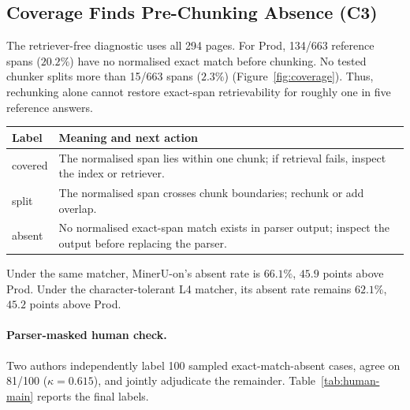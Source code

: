 \documentclass[11pt]{article}
\newcommand{\contribCoverage}{C3}
\begin{document}
\subsection{Coverage Finds Pre-Chunking Absence (\contribCoverage)}
\label{sec:c3}

The retriever-free diagnostic uses all 294 pages. For Prod, 134/663 reference spans ($20.2\%$) have no normalised exact match before chunking. No tested chunker splits more than 15/663 spans ($2.3\%$) (Figure~\ref{fig:coverage}). Thus, rechunking alone cannot restore exact-span retrievability for roughly one in five reference answers.

\begin{center}
\begin{minipage}{\columnwidth}
\centering\footnotesize
\setlength{\tabcolsep}{4pt}
\begin{tabular}{p{}p{}}
\toprule
Label & Meaning and next action \\
\midrule
covered & The normalised span lies within one chunk; if retrieval fails, inspect the index or retriever. \\
split & The normalised span crosses chunk boundaries; rechunk or add overlap. \\
absent & No normalised exact-span match exists in parser output; inspect the output before replacing the parser. \\
\bottomrule
\end{tabular}
\label{tab:coverage-actions}
\end{minipage}
\end{center}

Under the same matcher, MinerU-on's absent rate is $66.1\%$, $45.9$ points above Prod. Under the character-tolerant L4 matcher, its absent rate remains $62.1\%$, $45.2$ points above Prod.

\paragraph{Parser-masked human check.} Two authors independently label 100 sampled exact-match-absent cases, agree on 81/100 ($\kappa=0.615$), and jointly adjudicate the remainder. Table~\ref{tab:human-main} reports the final labels.
\end{document}
